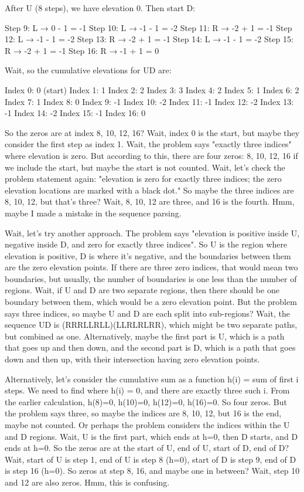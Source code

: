 After U (8 steps), we have elevation 0. Then start D:

Step 9: L → 0 - 1 = -1
Step 10: L → -1 - 1 = -2
Step 11: R → -2 + 1 = -1
Step 12: L → -1 - 1 = -2
Step 13: R → -2 + 1 = -1
Step 14: L → -1 - 1 = -2
Step 15: R → -2 + 1 = -1
Step 16: R → -1 + 1 = 0

Wait, so the cumulative elevations for UD are:

Index 0: 0 (start)
Index 1: 1
Index 2: 2
Index 3: 3
Index 4: 2
Index 5: 1
Index 6: 2
Index 7: 1
Index 8: 0
Index 9: -1
Index 10: -2
Index 11: -1
Index 12: -2
Index 13: -1
Index 14: -2
Index 15: -1
Index 16: 0

So the zeros are at index 8, 10, 12, 16? Wait, index 0 is the start, but maybe they consider the first step as index 1. Wait, the problem says "exactly three indices" where elevation is zero. But according to this, there are four zeros: 8, 10, 12, 16 if we include the start, but maybe the start is not counted. Wait, let's check the problem statement again: "elevation is zero for exactly three indices; the zero elevation locations are marked with a black dot." So maybe the three indices are 8, 10, 12, but that's three? Wait, 8, 10, 12 are three, and 16 is the fourth. Hmm, maybe I made a mistake in the sequence parsing.

Wait, let's try another approach. The problem says "elevation is positive inside U, negative inside D, and zero for exactly three indices". So U is the region where elevation is positive, D is where it's negative, and the boundaries between them are the zero elevation points. If there are three zero indices, that would mean two boundaries, but usually, the number of boundaries is one less than the number of regions. Wait, if U and D are two separate regions, then there should be one boundary between them, which would be a zero elevation point. But the problem says three indices, so maybe U and D are each split into sub-regions? Wait, the sequence UD is (RRRLLRLL)(LLRLRLRR), which might be two separate paths, but combined as one. Alternatively, maybe the first part is U, which is a path that goes up and then down, and the second part is D, which is a path that goes down and then up, with their intersection having zero elevation points.

Alternatively, let's consider the cumulative sum as a function h(i) = sum of first i steps. We need to find where h(i) = 0, and there are exactly three such i. From the earlier calculation, h(8)=0, h(10)=0, h(12)=0, h(16)=0. So four zeros. But the problem says three, so maybe the indices are 8, 10, 12, but 16 is the end, maybe not counted. Or perhaps the problem considers the indices within the U and D regions. Wait, U is the first part, which ends at h=0, then D starts, and D ends at h=0. So the zeros are at the start of U, end of U, start of D, end of D? Wait, start of U is step 1, end of U is step 8 (h=0), start of D is step 9, end of D is step 16 (h=0). So zeros at step 8, 16, and maybe one in between? Wait, step 10 and 12 are also zeros. Hmm, this is confusing.

